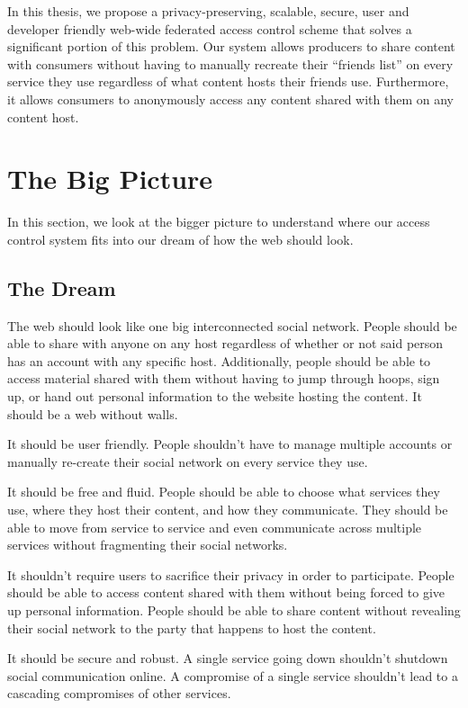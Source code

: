 \documentclass[pdftex,12pt,a4papaer,twoside,notitlepage]{report}
\begin{document}
In this thesis, we propose a privacy-preserving, scalable, secure, user and
developer friendly web-wide federated access control scheme that solves a
significant portion of this problem. Our system allows producers to share
content with consumers without having to manually recreate their ``friends
list'' on every service they use regardless of what content hosts their friends
use. Furthermore, it allows consumers to anonymously access any content shared
with them on any content host.

\section{The Big Picture}

In this section, we look at the bigger picture to understand where our access
control system fits into our dream of how the web should look.

\subsection{The Dream}

The web should look like one big interconnected social network. People should be
able to share with anyone on any host regardless of whether or not said person
has an account with any specific host. Additionally, people should be able to
access material shared with them without having to jump through hoops, sign up,
or hand out personal information to the website hosting the content. It should
be a web without walls.

It should be user friendly. People shouldn't have to manage multiple accounts or
manually re-create their social network on every service they use.

It should be free and fluid. People should be able to choose what services they
use, where they host their content, and how they communicate. They should be
able to move from service to service and even communicate across multiple
services without fragmenting their social networks.

It shouldn't require users to sacrifice their privacy in order to participate.
People should be able to access content shared with them without being forced to
give up personal information. People should be able to share content without
revealing their social network to the party that happens to host the content.

It should be secure and robust. A single service going down shouldn't shutdown
social communication online. A compromise of a single service shouldn't lead to
a cascading compromises of other services.
\end{document}
